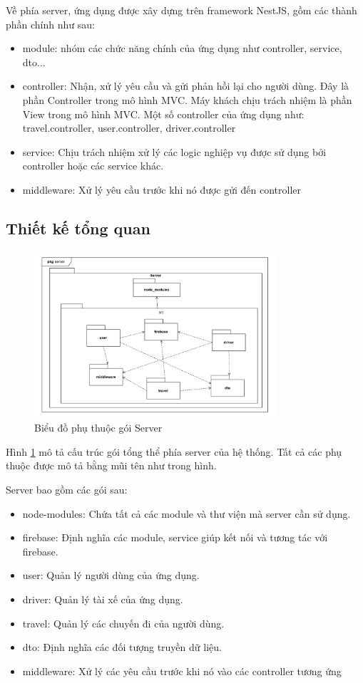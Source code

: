 \documentclass[../DoAn.tex]{subfiles}
\begin{document}
Về phía server, ứng dụng được xây dựng trên framework NestJS, gồm các 
thành phần chính như sau:
\begin{itemize}
    \item module: nhóm các chức năng chính của ứng dụng như controller, service, dto... 
    \item controller: Nhận, xử lý yêu cầu và gửi phản hồi lại cho người dùng. 
    Đây là phần Controller trong mô hình MVC. 
    Máy khách chịu trách nhiệm là phần View trong mô hình MVC.
    Một số controller của ứng dụng như: travel.controller, user.controller, 
    driver.controller
    \item service: Chịu trách nhiệm xử lý các logic nghiệp vụ được sử dụng 
    bởi controller hoặc các service khác.
    \item middleware: Xử lý yêu cầu trước khi nó được gửi đến controller
\end{itemize}

\subsection{Thiết kế tổng quan}
\begin{figure}[H]
    \centering
    \includegraphics[width=0.8\textwidth]{Hinhve/Bieu_do_phu_thuoc_goi_server.png}
    \caption{Biểu đồ phụ thuộc gói Server}
    \label{fig:Bieu_do_phu_thuoc_goi_server}
\end{figure}

Hình \ref{fig:Bieu_do_phu_thuoc_goi_server} mô tả cấu trúc gói tổng thể phía server của hệ thống.
Tất cả các phụ thuộc được mô tả bằng mũi tên như trong hình.

Server bao gồm các gói sau:
\begin{itemize}
    \item node-modules: Chứa tất cả các module và thư viện mà server cần sử dụng.
    \item firebase: Định nghĩa các module, service giúp kết nối và tương tác với firebase.
    \item user: Quản lý người dùng của ứng dụng.
    \item driver: Quản lý tài xế của ứng dụng.
    \item travel: Quản lý các chuyến đi của người dùng.
    \item dto: Định nghĩa các đối tượng truyền dữ liệu.
    \item middleware: Xử lý các yêu cầu trước khi nó vào các controller tương ứng
\end{itemize}
\end{document}
